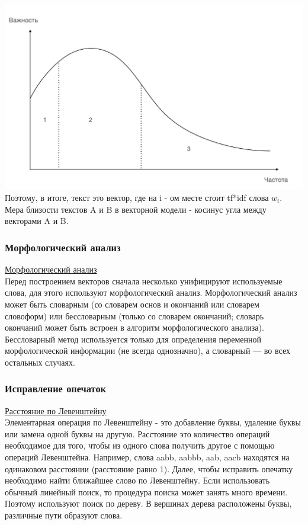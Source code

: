\includegraphics[width=0.5\linewidth]{13/Zipf}
Поэтому, в итоге, текст это вектор, где на i - ом месте стоит tf*idf слова $w_i$. Мера близости текстов A и B в векторной модели - косинус угла между векторами A и B.

\subsubsection {Морфологический анализ}
\href{http://prutzkow.com/ru-ru/science/natural-language-processing/morphology/}{Морфологический анализ} \\
Перед построением векторов сначала несколько унифицируют используемые слова, для этого используют морфологический анализ.
Морфологический анализ может быть словарным (со словарем основ и окончаний или словарем словоформ) или бессловарным (только со словарем окончаний; словарь окончаний может быть встроен в алгоритм морфологического анализа). Бессловарный метод используется только для определения переменной морфологической информации (не всегда однозначно), а словарный — во всех остальных случаях. 

\subsubsection {Исправление опечаток}
\href{https://clck.ru/A6RjQ}{Расстояние по Левенштейну} \\
Элементарная операция по Левенштейну - это добавление буквы, удаление буквы или замена одной буквы на другую. Расстояние это количество операций необходимое для того, чтобы из одного слова получить другое с помощью операций Левенштейна. Например, слова aabb, aabbb, aab, aacb находятся на одинаковом расстоянии (расстояние равно 1). Далее, чтобы исправить опечатку необходимо найти ближайшее слово по Левенштейну. Если использовать обычный линейный поиск, то процедура поиска может занять много времени. Поэтому используют поиск по дереву. В вершинах дерева расположены буквы, различные пути образуют слова. 

